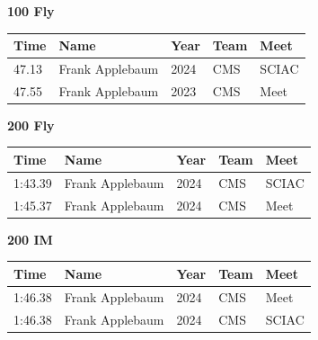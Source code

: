 \vspace{1.2em}
\noindent\begin{minipage}[t]{0.98\textwidth}
\centering
\textbf{\textcolor{teamprimary}{100 Fly}}\par
\vspace{0.5em}
\centering
\small
\renewcommand{\arraystretch}{1.0}
\setlength{\tabcolsep}{4pt}
\begin{tabular}{@{}p{2.5cm}p{4.5cm}p{1.5cm}p{2.5cm}p{2.5cm}@{}}
\toprule
\textbf{Time} & \textbf{Name} & \textbf{Year} & \textbf{Team} & \textbf{Meet} \\
\midrule
47.13 & Frank Applebaum & 2024 & CMS & SCIAC \\
47.55 & Frank Applebaum & 2023 & CMS & Meet \\
\bottomrule
\end{tabular}
\end{minipage}
\vspace{1.2em}
\noindent\begin{minipage}[t]{0.98\textwidth}
\centering
\textbf{\textcolor{teamprimary}{200 Fly}}\par
\vspace{0.5em}
\centering
\small
\renewcommand{\arraystretch}{1.0}
\setlength{\tabcolsep}{4pt}
\begin{tabular}{@{}p{2.5cm}p{4.5cm}p{1.5cm}p{2.5cm}p{2.5cm}@{}}
\toprule
\textbf{Time} & \textbf{Name} & \textbf{Year} & \textbf{Team} & \textbf{Meet} \\
\midrule
1:43.39 & Frank Applebaum & 2024 & CMS & SCIAC \\
1:45.37 & Frank Applebaum & 2024 & CMS & Meet \\
\bottomrule
\end{tabular}
\end{minipage}
\vspace{1.2em}
\noindent\begin{minipage}[t]{0.98\textwidth}
\centering
\textbf{\textcolor{teamprimary}{200 IM}}\par
\vspace{0.5em}
\centering
\small
\renewcommand{\arraystretch}{1.0}
\setlength{\tabcolsep}{4pt}
\begin{tabular}{@{}p{2.5cm}p{4.5cm}p{1.5cm}p{2.5cm}p{2.5cm}@{}}
\toprule
\textbf{Time} & \textbf{Name} & \textbf{Year} & \textbf{Team} & \textbf{Meet} \\
\midrule
1:46.38 & Frank Applebaum & 2024 & CMS & Meet \\
1:46.38 & Frank Applebaum & 2024 & CMS & SCIAC \\
\bottomrule
\end{tabular}
\end{minipage}

